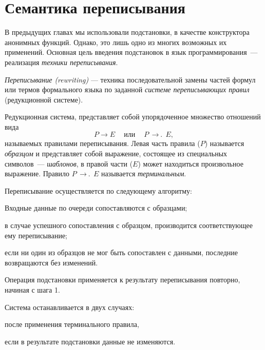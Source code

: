 \label{Less:rewriting}

\newcommand{\term}{\ensuremath{\mathop{\,\rightarrow\!\!.\,}}}

\section{Семантика  переписывания}%
В предыдущих главах мы использовали подстановки, в качестве конструктора анонимных функций. Однако, это лишь одно из многих возможных их применений. Основная цель введения подстановок в язык программирования~--- реализация \emph{техники переписывания}.

\emph{Переписывание (rewriting)} --- техника последовательной замены частей формул или термов формального языка по заданной \emph{системе переписывающих правил} (редукционной системе).

Редукционная система, представляет собой упорядоченное множество отношений вида $$P\to E~\quad\text{или}\quad~P\term E,$$ называемых правилами переписывания. Левая часть правила ($P$) называется \emph{образцом} и представляет собой выражение, состоящее из  специальных символов~--- \emph{шаблонов}, в правой части ($E$) может находиться произвольное выражение. Правило $P \term E$ называется \emph{терминальным}.

Переписывание осуществляется по следующему алгоритму:

\begin{Algorythm}\label{rewriting-semantics}
  \item Входные данные по очереди сопоставляются с образцами;
  \begin{Algorythm}
    \item в случае успешного сопоставления с образцом, производится соответствующее ему переписывание;
    \item если ни один из образцов не мог быть сопоставлен с данными, последние возвращаются без изменений.
  \end{Algorythm}
  \item Операция подстановки применяется к результату переписывания повторно, начиная с шага 1.
  \item Система останавливается в двух случаях:
  \begin{Algorythm} 
    \item после применения терминального правила,
    \item если в результате подстановки данные не изменяются.
  \end{Algorythm}
\end{Algorythm}

